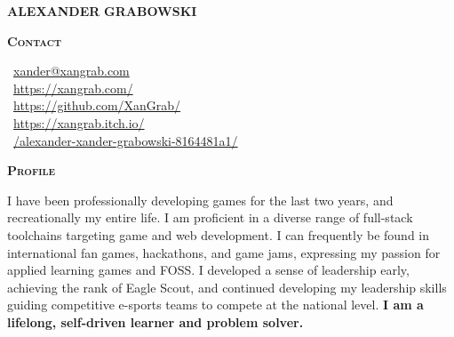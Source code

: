 \documentclass[11pt, a4paper]{article}
\newcommand{\headleft}[1]{\vspace*{3ex}\textsc{\textbf{#1}}\par%
    \vspace*{-2ex}\hrulefill\par\vspace*{0.7ex}}
\begin{document}
\setlength{\topskip}{0pt}
\setlength{\parindent}{0pt}
\setlength{\parskip}{0pt}
\setlength{\fboxsep}{0pt}
\pagestyle{empty}
\raggedbottom

\begin{minipage}[t]{0.33\textwidth} %

\vspace{-.2ex} %
\colorbox{cvblue!90}{\color{white}\hfill  %
\textwidth\relax%
\begin{minipage}[t][298mm][t]{0.84\textwidth}
\raggedright
\vspace*{1.5ex}

\vspace{3ex}
\begin{center}
    \Huge \textbf{ALEXANDER}\vspace{0.5ex}
    \textbf{GRABOWSKI} \normalsize 
\end{center}

\vspace*{-2.5ex} 

\headleft{Contact}
\faEnvelope\ \href{mailto:xander@xangrab.com}{xander@xangrab.com} \\[0.4ex]
\faGlobe\ \href{https://xangrab.com/}{https://xangrab.com/} \\[0.4ex]
\faGithub\ \href{https://github.com/XanGrab/}{https://github.com/XanGrab/} \\[0.4ex]
\faItchIo\ \href{https://xangrab.itch.io/}{https://xangrab.itch.io/} \\[0.4ex]
\faLinkedin\ \small{\href{https://www.linkedin.com/in/alexander-xander-grabowski-8164481a1/}{/alexander-xander-grabowski-8164481a1/} }


\headleft{Profile}
I have been professionally developing games for the last two years, and recreationally my entire life. I am proficient in a diverse range of full-stack toolchains targeting game and web development. I can frequently be found in international fan games, hackathons, and game jams, expressing my passion for applied learning games and FOSS. I developed a sense of leadership early, achieving the rank of Eagle Scout, and continued developing my leadership skills guiding competitive e-sports teams to compete at the national level. \textbf{I am a lifelong, self-driven learner and problem solver.}


\end{minipage}}
\end{minipage}
\end{document}
